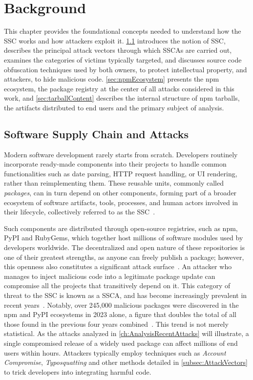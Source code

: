\chapter{Background}
\label{ch:background}

This chapter provides the foundational concepts needed to understand how the \ac{SSC} works and how attackers exploit it. 
\cref{sec:SSCAndSSCA} introduces the notion of \ac{SSC}, 
describes the principal attack vectors through which \acp{SSCA} are carried out,
examines the categories of victims typically targeted,
and discusses source code obfuscation techniques used by both owners, to protect intellectual property, and attackers, to hide malicious code.
\cref{sec:npmEcosystem} presents the \ac{npm} ecosystem, 
the package registry at the center of all attacks considered in this work,  
and \cref{sec:tarballContent} describes the internal structure of \ac{npm} tarballs, 
the artifacts distributed to end users and the primary subject of analysis.

\section{Software Supply Chain and Attacks}
\label{sec:SSCAndSSCA}

Modern software development rarely starts from scratch.
Developers routinely incorporate ready-made components into their projects
to handle common functionalities such as date parsing, HTTP request handling, or UI rendering,
rather than reimplementing them.
These reusable units, commonly called \emph{packages},
can in turn depend on other components, 
forming part of a broader ecosystem of software artifacts, tools, processes, 
and human actors involved in their lifecycle, collectively referred to as the \ac{SSC}~\cite{softwareSupplyChain}.

Such components are distributed through open-source registries, such as \ac{npm}, \ac{PyPI} and RubyGems,
which together host millions of software modules used by developers worldwide. 
The decentralized and open nature of these repositories is one of their greatest strengths,
as anyone can freely publish a package; 
however, this openness also constitutes a significant attack surface~\cite{ohm2020backstabbersknifecollectionreview}.
An attacker who manages to inject malicious code into a legitimate package update can compromise all the projects that transitively depend on it.
This category of threat to the \ac{SSC} is known as a \ac{SSCA}, and has become 
increasingly prevalent in recent years~\cite{ohm2020backstabbersknifecollectionreview}.
Notably, over 245,000 malicious packages were discovered in the \ac{npm} and \ac{PyPI} ecosystems in 2023 alone,
a figure that doubles the total of all those found in the previous four years combined~\cite{10.1145/3691620.3695492}. 
This trend is not merely statistical. As the attacks analyzed in \cref{ch:AnalysisRecentAttacks} will illustrate,  
a single compromised release of a widely used package can affect millions of end users within hours.
Attackers typically employ techniques such as \emph{Account Compromise}, 
\emph{Typosquatting} and other methods detailed in \cref{subsec:AttackVectors} to trick developers into integrating harmful code.

